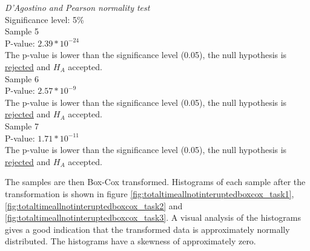\begin{center}
	\begin{tcolorbox}[width=0.8\textwidth]
		\centering
		\textit{D'Agostino and Pearson normality test}\\
		Significance level: 5\%  \\[0.5cm]
		
		Sample 5 \\
		P-value: $2.39 * 10^{-24}$\\
		The p-value is lower than the significance level (0.05), the null hypothesis is \underline{rejected} and $H_A$ accepted.\\[0.5cm]
		
		Sample 6 \\
		P-value: $2.57 * 10^{-9}$ \\
		The p-value is lower than the significance level (0.05), the null hypothesis is \underline{rejected} and $H_A$ accepted.\\[0.5cm]
		
		Sample 7 \\
		P-value: $1.71 * 10^{-11}$ \\
		The p-value is lower than the significance level (0.05), the null hypothesis is \underline{rejected} and $H_A$ accepted.\\[0.5cm]
	\end{tcolorbox} 
\end{center}

\vspace{0.3cm}

The samples are then Box-Cox transformed. Histograms of each sample after the transformation is shown in figure \ref{fig:totaltimeallnotinteruptedboxcox_task1}, \ref{fig:totaltimeallnotinteruptedboxcox_task2} and \ref{fig:totaltimeallnotinteruptedboxcox_task3}. A visual analysis of the histograms gives a good indication that the transformed data is approximately normally distributed. The histograms have a skewness of approximately zero. 

